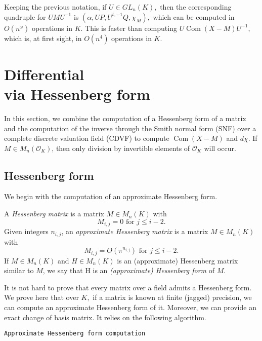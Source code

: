 \documentclass{sig-alternate-05-2015}
\DeclareMathOperator{\com}{Com}
\newcommand{\OK}{\mathcal{O}_K}
\begin{document}
\begin{rem}
Keeping the previous notation, if $U \in GL_n(K),$
then the corresponding quadruple for 
$UMU^{-1}$ is
$(\alpha, UP, U^{t,-1}Q, \chi_M),$
which can be computed in $O(n^\omega)$ operations in $K.$
This is faster than computing $U \com(X-M) U^{-1},$
which is, at first sight, in $O(n^4)$ operations in $K.$
\end{rem}

\section{Differential\\via Hessenberg form}
\label{sec:diffHess}

In this section, we combine the computation of a Hessenberg form
of a matrix and the computation of the inverse through the Smith normal form (SNF)
over a complete discrete valuation field (CDVF)
to compute $\com(X-M)$ and $d \chi$.
If $M \in M_n(\OK)$, then only division by invertible
elements of $\OK$ will occur.

\subsection{Hessenberg form}

We begin with the computation of
an approximate Hessenberg form.

\begin{deftn}
A \emph{Hessenberg matrix} is a matrix $M \in M_n(K)$ with
\[
M_{i,j}=0 \mbox{ for $j \le i-2$.}
\]
Given integers $n_{i,j}$, an \emph{approximate Hessenberg matrix}
is a matrix $M \in M_n(K)$ with
\[
M_{i,j} = O(\pi^{n_{i,j}}) \mbox{ for $j \le i-2$.}
\]
If $M \in M_n (K)$ and $H \in M_n (K)$ is an (approximate) Hessenberg matrix
similar to $M$, we say that H is an \emph{(approximate) Hessenberg form} of $M.$
\end{deftn}

It is not hard to prove that every matrix over a field admits
a Hessenberg form.
We prove here that over $K,$ if a matrix is 
known at finite (jagged) precision,
we can compute an approximate Hessenberg form of it.
Moreover, we can provide an exact change of basis matrix.
It relies on the following algorithm.


\noindent\hrulefill

 {\tt Approximate Hessenberg form computation}
\end{document}
